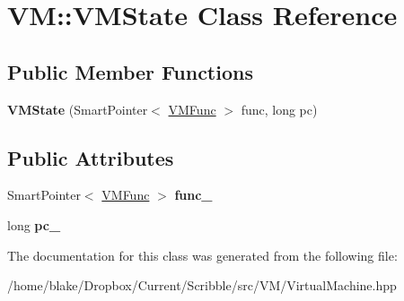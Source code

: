 \hypertarget{class_v_m_1_1_v_m_state}{\section{V\-M\-:\-:V\-M\-State Class Reference}
\label{class_v_m_1_1_v_m_state}
}
\subsection*{Public Member Functions}
\begin{DoxyCompactItemize}
\item 
\hypertarget{class_v_m_1_1_v_m_state_a69de139721e7240b2945f741d78453ac}{{\bfseries V\-M\-State} (Smart\-Pointer$<$ \hyperlink{class_v_m_1_1_v_m_func}{V\-M\-Func} $>$ func, long pc)}\label{class_v_m_1_1_v_m_state_a69de139721e7240b2945f741d78453ac}

\end{DoxyCompactItemize}
\subsection*{Public Attributes}
\begin{DoxyCompactItemize}
\item 
\hypertarget{class_v_m_1_1_v_m_state_a2ff18b30485d687b3a33815a70b76914}{Smart\-Pointer$<$ \hyperlink{class_v_m_1_1_v_m_func}{V\-M\-Func} $>$ {\bfseries func\-\_\-}}\label{class_v_m_1_1_v_m_state_a2ff18b30485d687b3a33815a70b76914}

\item 
\hypertarget{class_v_m_1_1_v_m_state_a07129fa10e4c131b28dacf7ee3aee917}{long {\bfseries pc\-\_\-}}\label{class_v_m_1_1_v_m_state_a07129fa10e4c131b28dacf7ee3aee917}

\end{DoxyCompactItemize}


The documentation for this class was generated from the following file\-:\begin{DoxyCompactItemize}
\item 
/home/blake/\-Dropbox/\-Current/\-Scribble/src/\-V\-M/Virtual\-Machine.\-hpp\end{DoxyCompactItemize}
